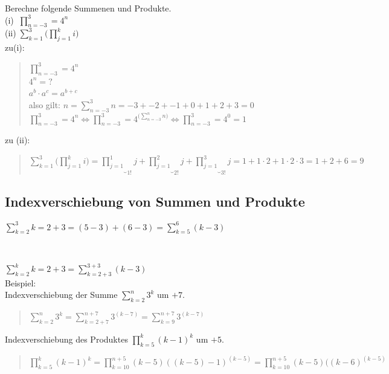 Berechne folgende Summenen und Produkte.\\
(i)$\;\;\prod\limits_{n=-3}^{3}=4^n $\\
(ii)$\;\sum\limits_{k=1}^{3}\bigg(\prod\limits_{j=1}^{k}i\bigg)  $\vspace*{2mm}\\
\newpage
\noindent
zu(i):
\begin{quote}
	$\prod\limits_{n=-3}^{3}=4^n $\\
	$ 4^n=? $\\
	$ a^b\cdot a^c=a^{b+c} $\\
	also gilt: $ n=\sum\limits_{n=-3}^{3}n=-3+-2+-1+0+1+2+3=0 $\\
	$\prod\limits_{n=-3}^{3}=4^n\Leftrightarrow\prod\limits_{n=-3}^{3}=4^{\big(\scriptscriptstyle\sum\limits_{n=-3}^{n}n\big)}\Leftrightarrow\prod\limits_{n=-3}^{3}=4^0=1$  
\end{quote}
zu (ii):
\begin{quote}
	$ \sum\limits_{k=1}^{3}\bigg(\prod\limits_{j=1}^{k}i\bigg) = \underbrace {\prod\limits_{j=1}^{1}}_{1!}j+\underbrace {\prod\limits_{j=1}^{2}}_{2!}j+\underbrace {\prod\limits_{j=1}^{3}}_{3!}j=1+1\cdot2+1\cdot2\cdot3=1+2+6=9 $
\end{quote}
\subsection{Indexverschiebung von Summen und Produkte}

$ \sum\limits_{k=2}^{3}k=2+3=(5-3) +(6-3)=\sum\limits_{k=5}^{6}(k-3)$\\
\begin{center}
	\\
	
\end{center}
$ \sum\limits_{k=2}^{k}k=2+3=\sum\limits_{\scriptscriptstyle k=2+3}^{3+3}(k-3)$\vspace*{2mm}\\
Beispiel:\\
\textbullet\;\; Indexverschiebung der Summe $ \sum\limits_{k=2}^{n}3^k  $ um $ +7 $.
\begin{quote}
	$ \sum\limits_{k=2}^{n}3^k=\sum\limits_{\scriptscriptstyle k=2+7}^{n+7}3^{(k-7)}=\sum\limits_{k=9}^{n+7}3^{(k-7)} $
\end{quote}
\textbullet\;\; Indexverschiebung des Produktes $ \prod\limits_{k=5}^k(k-1)^k  $ um $ +5 $.\\
\begin{quote}
	$ \prod\limits_{k=5}^k(k-1)^k=\prod\limits_{k=10}^{n+5}(k-5)((k-5)-1)^{(k-5)}=\prod\limits_{k=10}^{n+5}(k-5)((k-6)^{(k-5)} $
\end{quote}
